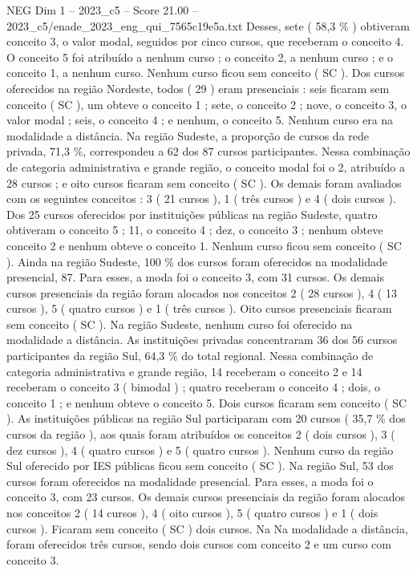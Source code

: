 \begin{textsample}{NEG Dim 1 – 2023\_c5 – Score 21.00 – 2023\_c5/enade\_2023\_eng\_qui\_7565c19e5a.txt}
Desses, sete ( 58,3 \% ) obtiveram conceito 3, o valor modal, seguidos por cinco cursos, que receberam o conceito 4.
O conceito 5 foi atribuído a nenhum curso ; o conceito 2, a nenhum curso ; e o conceito 1, a nenhum curso.
Nenhum curso ficou sem conceito ( SC ).
Dos cursos oferecidos na região Nordeste, todos ( 29 ) eram presenciais : seis ficaram sem conceito ( SC ), um obteve o conceito 1 ; sete, o conceito 2 ; nove, o conceito 3, o valor modal ; seis, o conceito 4 ; e nenhum, o conceito 5.
Nenhum curso era na modalidade a distância.
Na região Sudeste, a proporção de cursos da rede privada, 71,3 \%, correspondeu a 62 dos 87 cursos participantes.
Nessa combinação de categoria administrativa e grande região, o conceito modal foi o 2, atribuído a 28 cursos ; e oito cursos ficaram sem conceito ( SC ).
Os demais foram avaliados com os seguintes conceitos : 3 ( 21 cursos ), 1 ( três cursos ) e 4 ( dois cursos ).
Dos 25 cursos oferecidos por instituições públicas na região Sudeste, quatro obtiveram o conceito 5 ; 11, o conceito 4 ; dez, o conceito 3 ; nenhum obteve conceito 2 e nenhum obteve o conceito 1.
Nenhum curso ficou sem conceito ( SC ).
Ainda na região Sudeste, 100 \% dos cursos foram oferecidos na modalidade presencial, 87.
Para esses, a moda foi o conceito 3, com 31 cursos.
Os demais cursos presenciais da região foram alocados nos conceitos 2 ( 28 cursos ), 4 ( 13 cursos ), 5 ( quatro cursos ) e 1 ( três cursos ).
Oito cursos presenciais ficaram sem conceito ( SC ).
Na região Sudeste, nenhum curso foi oferecido na modalidade a distância.
As instituições privadas concentraram 36 dos 56 cursos participantes da região Sul, 64,3 \% do total regional.
Nessa combinação de categoria administrativa e grande região, 14 receberam o conceito 2 e 14 receberam o conceito 3 ( bimodal ) ; quatro receberam o conceito 4 ; dois, o conceito 1 ; e nenhum obteve o conceito 5.
Dois cursos ficaram sem conceito ( SC ).
As instituições públicas na região Sul participaram com 20 cursos ( 35,7 \% dos cursos da região ), aos quais foram atribuídos os conceitos 2 ( dois cursos ), 3 ( dez cursos ), 4 ( quatro cursos ) e 5 ( quatro cursos ).
Nenhum curso da região Sul oferecido por IES públicas ficou sem conceito ( SC ).
Na região Sul, 53 dos cursos foram oferecidos na modalidade presencial.
Para esses, a moda foi o conceito 3, com 23 cursos.
Os demais cursos presenciais da região foram alocados nos conceitos 2 ( 14 cursos ), 4 ( oito cursos ), 5 ( quatro cursos ) e 1 ( dois cursos ).
Ficaram sem conceito ( SC ) dois cursos.
Na Na modalidade a distância, foram oferecidos três cursos, sendo dois cursos com conceito 2 e um curso com conceito 3.

\end{textsample}
